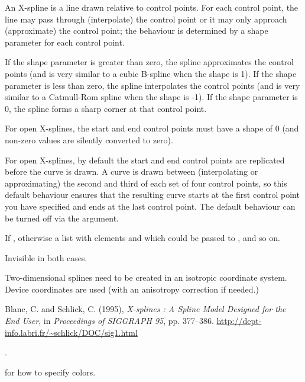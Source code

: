 %
\begin{Details}\relax
An X-spline is a line drawn relative to control points.  For each
control point, the line may pass through (interpolate) the control
point or it may only approach (approximate) the control point;  the
behaviour is determined by a shape parameter for each control point.

If the shape parameter is greater than zero, the spline approximates
the control points (and is very similar to a cubic B-spline when the
shape is 1).  If the shape parameter is less than zero, the spline
interpolates the control points (and is very similar to a Catmull-Rom
spline when the shape is -1).  If the shape parameter is 0, the spline
forms a sharp corner at that control point.

For open X-splines, the start and end control points must have a shape
of 0 (and non-zero values are silently converted to zero).

For open X-splines, by default the start and end control points are
replicated before the curve is drawn.  A curve is drawn between
(interpolating or approximating) the second and third of each set of
four control points, so this default behaviour ensures that the
resulting curve starts at the first control point you have specified
and ends at the last control point.  The default behaviour can be
turned off via the  argument.
\end{Details}
%
\begin{Value}
If ,  otherwise a list with elements
 and  which could be passed to ,
 and so on.

Invisible in both cases.
\end{Value}
%
\begin{Note}\relax
Two-dimensional splines need to be created in an isotropic coordinate
system.  Device coordinates are used (with an anisotropy correction if
needed.)
\end{Note}
%
\begin{References}\relax
Blanc, C. and Schlick, C. (1995),
\emph{X-splines : A Spline Model Designed for the End User},
in \emph{Proceedings of SIGGRAPH 95}, pp. 377--386.
\url{http://dept-info.labri.fr/~schlick/DOC/sig1.html}
\end{References}
%
\begin{SeeAlso}\relax
{}.

 for how to specify colors.
\end{SeeAlso}
